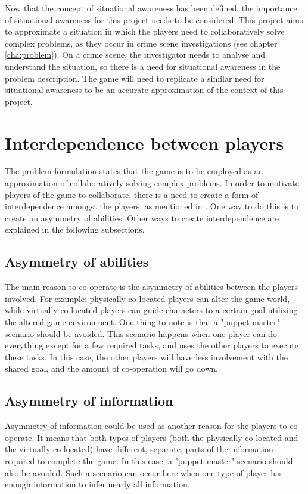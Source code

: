 		Now that the concept of situational awareness has been defined, the
		importance of situational awareness for this project needs to be
		considered. This project aims to approximate a situation in which the
		players need to collaboratively solve complex problems, as they occur in
		crime scene investigations (see chapter \ref{cha:problem}). On a crime
		scene, the investigator needs to analyse and understand the situation,
		so there is a need for situational awareness in the problem description.
		The game will need to replicate a similar need for situational awareness
		to be an accurate approximation of the context of this project.

	\section{Interdependence between players} \label{sec:interdependence}
		The problem formulation states that the game is to be employed as an
		approximation of collaboratively solving complex problems. In order to
		motivate players of the game to collaborate, there is a need to create
		a form of interdependence amongst the players, as mentioned in
		\cite{zagal}. One way to do this is to create an asymmetry of abilities.
		Other ways to create interdependence are explained in the following
		subsections.
		\subsection{Asymmetry of abilities} \label{ssec:ability}
			The main reason to co-operate is the asymmetry of abilities between
			the players involved. For example: physically co-located players can
			alter the game world, while virtually co-located players can guide
			characters to a certain goal utilizing the altered game environment.
			One thing to note is that a "puppet master" scenario should be
			avoided. This scenario happens when one player can do everything
			except for a few required tasks, and uses the other players to
			execute these tasks. In this case, the other players will have less
			involvement with the shared goal, and the amount of co-operation
			will go down.
		\subsection{Asymmetry of information} \label{ssec:information}
			Asymmetry of information could be used as another reason for the
			players to co-operate. It means that both types of players (both the
			physically co-located and the virtually co-located) have different,
			separate, parts of the information required to complete the game. In
			this case, a "puppet master" scenario should also be avoided. Such a
			scenario can occur here when one type of player has enough
			information to infer nearly all information.

